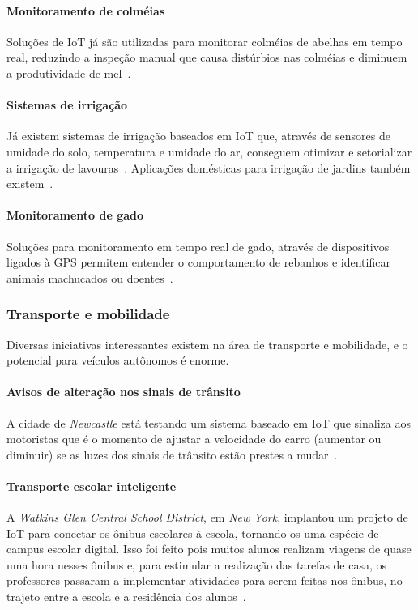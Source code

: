 \documentclass[pdftex, brazil, 12pt, twoside]{article}
\newcommand{\ingles}[1]{\textit{#1}}
\begin{document}
\paragraph{Monitoramento de colméias} Soluções de IoT já são utilizadas para
monitorar colméias de abelhas em tempo real, reduzindo a inspeção manual que causa
distúrbios nas colméias e diminuem a produtividade de mel~\citep{SilvaIoTColmeia2017}.

\paragraph{Sistemas de irrigação} Já existem sistemas de irrigação baseados em IoT
que, através de sensores de umidade do solo, temperatura e umidade do ar, conseguem
otimizar e setorializar a irrigação de lavouras~\citep{UKGOSWalportIoT2014}. Aplicações
domésticas para irrigação de jardins também existem~\citep{GrehsIrrigacaoIoT2016}.

\paragraph{Monitoramento de gado} Soluções para monitoramento em tempo real de gado,
através de dispositivos ligados à GPS permitem entender o comportamento de rebanhos e
identificar animais machucados ou doentes~\citep{SpinkIoTTrackAnimals2013}.


\subsubsection{Transporte e mobilidade}
\label{aplicacoes-iot-exemplos-transporte}

Diversas iniciativas interessantes existem na área de transporte e mobilidade,
e o potencial para veículos autônomos é enorme.

\paragraph{Avisos de alteração nos sinais de trânsito} A cidade de \ingles{Newcastle}
está testando um sistema baseado em IoT que sinaliza aos motoristas que é o momento
de ajustar a velocidade do carro (aumentar ou diminuir) se as luzes dos sinais
de trânsito estão prestes a mudar~\citep{UKGOSWalportIoT2014}.

\paragraph{Transporte escolar inteligente} A \ingles{Watkins Glen Central School District},
em \ingles{New York}, implantou um projeto de IoT para conectar os ônibus escolares
à escola, tornando-os uma espécie de campus escolar digital. Isso foi feito pois muitos
alunos realizam viagens de quase uma hora nesses ônibus e, para estimular a realização
das tarefas de casa, os professores passaram a implementar atividades para serem feitas
nos ônibus, no trajeto entre a escola e a residência dos alunos~\citep{GlenSchoolBusIoT2016}.
\end{document}
